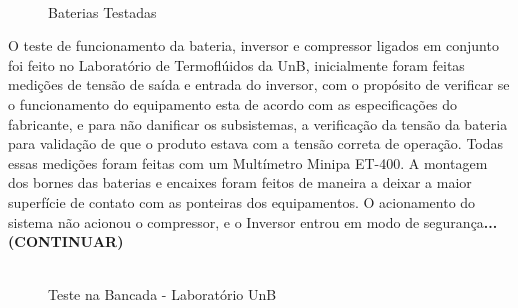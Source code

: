   \begin{figure}[H]
    \centering
    \includegraphics[width=0.7]{figuras/baterias_testadas}
    \caption{Baterias Testadas}
    \label{fig:baterias_testadas}
\end{figure}
		
       O teste de funcionamento da bateria, inversor e compressor ligados em conjunto foi feito no Laboratório de Termoflúidos da UnB, inicialmente foram feitas medições de tensão de saída e entrada do inversor, com o propósito  de verificar se o funcionamento do equipamento esta de acordo com as especificações do fabricante, e para não danificar os subsistemas, a verificação da tensão da bateria para validação de que o produto estava com a tensão correta de operação. Todas essas medições foram feitas com um Multímetro Minipa ET-400. A montagem dos bornes das baterias e encaixes foram feitos de maneira a deixar a maior superfície de contato com as ponteiras dos equipamentos.
       O acionamento do sistema não acionou o compressor, e o Inversor entrou em modo de segurança\textbf{...(CONTINUAR)}
       
         \begin{figure}[H]
    \centering
    \includegraphics[width=0.7]{figuras/teste_bancada}
    \caption{Teste na Bancada - Laboratório UnB}
    \label{fig:teste_bancada}
\end{figure}